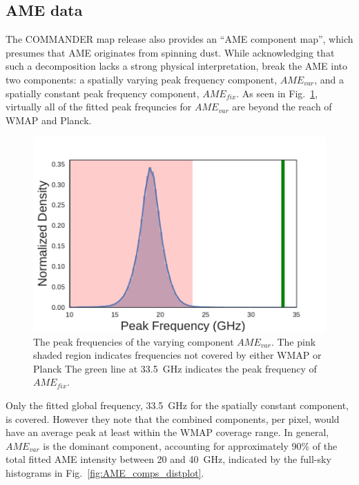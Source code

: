       \subsection{AME data}
          The COMMANDER map release also provides an ``AME component map'', which presumes that AME originates from spinning dust. While acknowledging that such a decomposition lacks a strong physical interpretation, \cite{planck15X} break the AME into two components: a spatially varying peak frequency component, $AME_{var}$, and a spatially constant peak frequency component, $AME_{fix}$. As seen in Fig.~\ref{fig:AME_commander_freqdist}, virtually all of the fitted peak frequncies for $AME_{var}$ are beyond the reach of WMAP and Planck.
              \begin{figure}
                \includegraphics[width=\textwidth]{../Plots/ch_intro/AME_commander_freqdist.pdf}
                \centering
                \caption{The peak frequencies of the varying component $AME_{var}$.  The pink shaded region indicates frequencies not covered by either WMAP or Planck The green line at 33.5~GHz indicates the peak frequency of $AME_{fix}$.}
                \label{fig:AME_commander_freqdist}
              \end{figure}
          Only the fitted global frequency, 33.5~GHz for the spatially constant component, is covered. However they note that the combined components, per pixel, would have an average peak  at least within the WMAP coverage range. In general, $AME_{var}$ is the dominant component, accounting for approximately 90\% of the total fitted AME intensity between 20 and 40~GHz, indicated by the full-sky histograms in Fig.~\ref{fig:AME_comps_distplot}.
